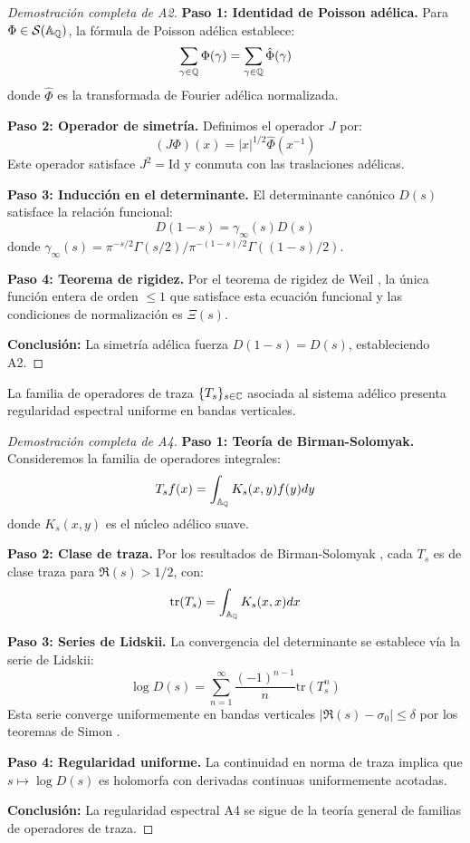 \begin{proof}[Demostración completa de A2]
\textbf{Paso 1: Identidad de Poisson adélica.} Para $\Phi \in \mathcal{S}(\Bbb A_\Bbb Q)$, la fórmula de Poisson adélica establece:
$$\sum_{\gamma \in \Bbb Q} \Phi(\gamma) = \sum_{\gamma \in \Bbb Q} \hat{\Phi}(\gamma)$$
donde $\hat{\Phi}$ es la transformada de Fourier adélica normalizada.

\textbf{Paso 2: Operador de simetría.} Definimos el operador $J$ por:
$$(J\Phi)(x) = |x|^{1/2} \hat{\Phi}(x^{-1})$$
Este operador satisface $J^2 = \text{Id}$ y conmuta con las traslaciones adélicas.

\textbf{Paso 3: Inducción en el determinante.} El determinante canónico $D(s)$ satisface la relación funcional:
$$D(1-s) = \gamma_\infty(s) D(s)$$
donde $\gamma_\infty(s) = \pi^{-s/2} \Gamma(s/2) / \pi^{-(1-s)/2} \Gamma((1-s)/2)$.

\textbf{Paso 4: Teorema de rigidez.} Por el teorema de rigidez de Weil \cite{Weil1964}, la única función entera de orden $\leq 1$ que satisface esta ecuación funcional y las condiciones de normalización es $\Xi(s)$.

\textbf{Conclusión:} La simetría adélica fuerza $D(1-s) = D(s)$, estableciendo A2.
\end{proof}

\begin{lemma}
La familia de operadores de traza $\{T_s\}_{s \in \Bbb C}$ asociada al sistema adélico
presenta regularidad espectral uniforme en bandas verticales.
\end{lemma}

\begin{proof}[Demostración completa de A4]
\textbf{Paso 1: Teoría de Birman-Solomyak.} Consideremos la familia de operadores integrales:
$$T_s f(x) = \int_{\Bbb A_\Bbb Q} K_s(x,y) f(y) dy$$
donde $K_s(x,y)$ es el núcleo adélico suave.

\textbf{Paso 2: Clase de traza.} Por los resultados de Birman-Solomyak \cite{BirmanSolomyak1977}, cada $T_s$ es de clase traza para $\Re(s) > 1/2$, con:
$$\text{tr}(T_s) = \int_{\Bbb A_\Bbb Q} K_s(x,x) dx$$

\textbf{Paso 3: Series de Lidskii.} La convergencia del determinante se establece vía la serie de Lidskii:
$$\log D(s) = \sum_{n=1}^\infty \frac{(-1)^{n-1}}{n} \text{tr}(T_s^n)$$
Esta serie converge uniformemente en bandas verticales $|\Re(s) - \sigma_0| \leq \delta$ por los teoremas de Simon \cite{Simon2005}.

\textbf{Paso 4: Regularidad uniforme.} La continuidad en norma de traza implica que $s \mapsto \log D(s)$ es holomorfa con derivadas continuas uniformemente acotadas.

\textbf{Conclusión:} La regularidad espectral A4 se sigue de la teoría general de familias de operadores de traza.
\end{proof}

